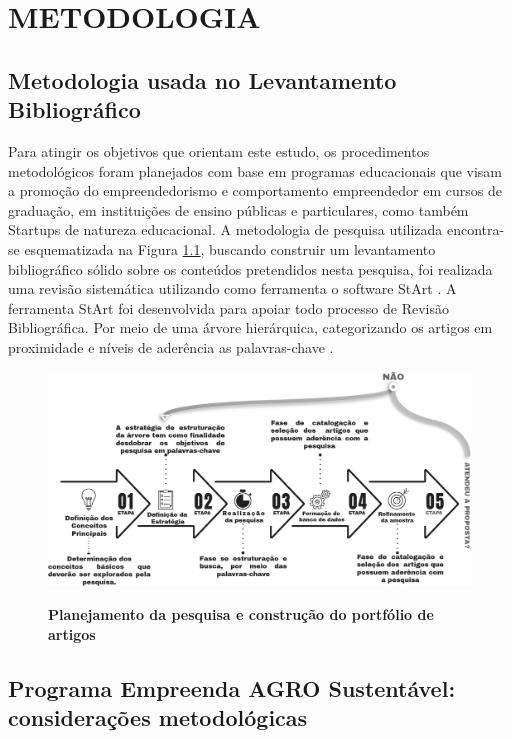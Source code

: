 \chapter{METODOLOGIA}

\section{Metodologia usada no Levantamento Bibliográfico}


Para atingir os objetivos que orientam este estudo, os procedimentos metodológicos foram planejados com base em programas educacionais que visam a promoção do empreendedorismo e comportamento empreendedor em cursos de graduação, em instituições de ensino públicas e particulares, como também Startups de natureza educacional. A metodologia de pesquisa utilizada encontra-se esquematizada na Figura \ref{figura_29}, buscando construir um levantamento bibliográfico sólido sobre os conteúdos pretendidos nesta pesquisa, foi realizada uma revisão sistemática utilizando como ferramenta o software StArt \cite{lapes_start_2016}. A ferramenta StArt foi desenvolvida para apoiar todo processo de Revisão Bibliográfica. Por meio de uma árvore hierárquica, categorizando os artigos em proximidade e níveis de aderência as palavras-chave \cite{hernandes_avaliacao_2010}. 

\begin{figure}[H]
\centering
\caption{\textbf{Planejamento da pesquisa e construção do portfólio de artigos}}
\includegraphics[scale=0.6]{Imagens/fases_pesquisa_bibliografica.png}
\label{figura_29}
\end{figure}

\section{Programa Empreenda AGRO Sustentável: considerações metodológicas}



